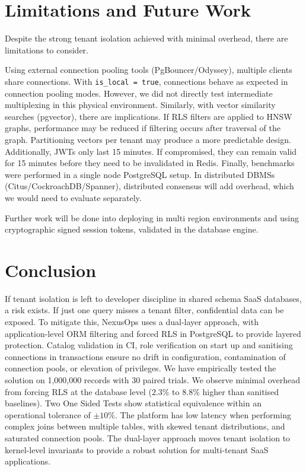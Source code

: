 \documentclass[conference]{IEEEtran}
\begin{document}
\section{Limitations and Future Work}
\label{sec:limitations}
Despite the strong tenant isolation achieved with minimal overhead, there are limitations to consider.

Using external connection pooling tools (PgBouncer/Odyssey), multiple clients share connections. With \texttt{is\_local = true}, connections behave as expected in connection pooling modes. However, we did not directly test intermediate multiplexing in this physical environment. Similarly, with vector similarity searches (pgvector), there are implications. If RLS filters are applied to HNSW graphs, performance may be reduced if filtering occurs after traversal of the graph. Partitioning vectors per tenant may produce a more predictable design. Additionally, JWTs only last 15 minutes. If compromised, they can remain valid for 15 minutes before they need to be invalidated in Redis. Finally, benchmarks were performed in a single node PostgreSQL setup. In distributed DBMSs (Citus/CockroachDB/Spanner), distributed consensus will add overhead, which we would need to evaluate separately.

Further work will be done into deploying in multi region environments and using cryptographic signed session tokens, validated in the database engine.

\section{Conclusion}
\label{sec:conclusion}
If tenant isolation is left to developer discipline in shared schema SaaS databases, a risk exists. If just one query misses a tenant filter, confidential data can be exposed. To mitigate this, NexusOps uses a dual-layer approach, with application-level ORM filtering and forced RLS in PostgreSQL to provide layered protection. Catalog validation in CI, role verification on start up and sanitising connections in transactions ensure no drift in configuration, contamination of connection pools, or elevation of privileges. We have empirically tested the solution on 1,000,000 records with 30 paired trials. We observe minimal overhead from forcing RLS at the database level ($2.3\%$ to $8.8\%$ higher than sanitised baselines). Two One Sided Tests show statistical equivalence within an operational tolerance of $\pm 10\%$. The platform has low latency when performing complex joins between multiple tables, with skewed tenant distributions, and saturated connection pools. The dual-layer approach moves tenant isolation to kernel-level invariants to provide a robust solution for multi-tenant SaaS applications.
\end{document}
